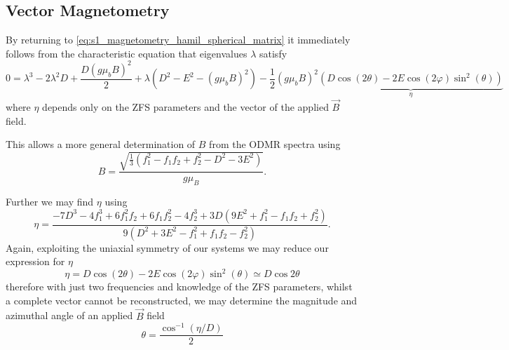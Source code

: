 \subsection{Vector Magnetometry}
By returning to \eqref{eq:s1_magnetometry_hamil_spherical_matrix} it immediately follows from the characteristic equation that eigenvalues $\lambda$ satisfy
\begin{equation}
	0 = \lambda^3 - 2\lambda^2 D + \frac{D (g\mu_b B)^2}{2} + \lambda(D^2 - E^2 - (g\mu_b B)^2) - \frac{1}{2}(g\mu_b B)^2\underbrace{\left(D \cos(2\theta) - 2  E \cos(2\varphi)  \sin^2(\theta)\right)}_{\eta}
	\label{eq:nv_spherical_characteristic_equation}
\end{equation}
where $\eta$ depends only on the ZFS parameters and the vector of the applied $\vec{B}$ field.

This allows a more general determination of $B$ from the ODMR spectra using
\begin{equation}
	B = \frac{\sqrt{\frac{1}{3} \left(f_1^2 - f_1 f_2 + f_2^2 -D^2 -3E^2\right)}}{g \mu_B}.
	\label{eq:spin1_magnet_magnitude}
\end{equation}

Further we may find $\eta$ using
\begin{equation}
	\eta = \frac{-7 D^3 - 4f_1^3 + 6 f_1^2 f_2 + 6f_1 f_2^2 - 4f_2^3 + 3D(9E^2 + f_1^2 -f_1 f_2 + f_2^2)}{9(D^2 + 3E^2 - f_1^2 + f_1f_2 - f_2^2)}.
	\label{eq:}
\end{equation}
Again, exploiting the uniaxial symmetry of our systems we may reduce our expression for $\eta$
\begin{equation}
	\eta = D \cos(2\theta) - 2  E \cos(2\varphi) \sin^2(\theta) \simeq D \cos2\theta
	\label{eq:}
\end{equation}
therefore with just two frequencies and knowledge of the ZFS parameters, whilst a complete vector cannot be reconstructed, we may determine the magnitude and azimuthal angle of an applied $\vec{B}$ field
\begin{equation}
	\theta = \frac{\cos^{-1} (\eta/D)}{2}
	\label{eq:spin1_magnet_theta}
\end{equation}


